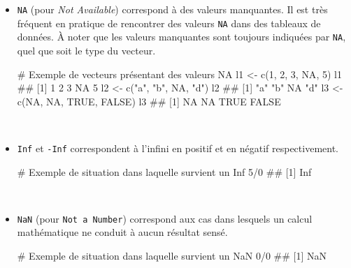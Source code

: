 \documentclass[12pt,twosided, notitlepage]{book}
\newenvironment{Shaded}{}{}
\newcommand{\KeywordTok}[1]{\textcolor[rgb]{0.00,0.00,1.00}{#1}}
\newcommand{\DecValTok}[1]{#1}
\newcommand{\StringTok}[1]{\textcolor[rgb]{0.00,0.50,0.50}{#1}}
\newcommand{\CommentTok}[1]{\textcolor[rgb]{0.00,0.50,0.00}{#1}}
\newcommand{\OtherTok}[1]{\textcolor[rgb]{1.00,0.25,0.00}{#1}}
\newcommand{\OperatorTok}[1]{#1}
\newcommand{\NormalTok}[1]{#1}
\renewenvironment{Shaded}{\begin{snugshade}}{\end{snugshade}}
\begin{document}
\begin{itemize}
\item
  \texttt{NA} (pour \emph{Not Available}) correspond à des valeurs
  manquantes. Il est très fréquent en pratique de rencontrer des valeurs
  \texttt{NA} dans des tableaux de données. À noter que les valeurs
  manquantes sont toujours indiquées par \texttt{NA}, quel que soit le
  type du vecteur.

\begin{Shaded}
\begin{Highlighting}[]
\CommentTok{# Exemple de vecteurs présentant des valeurs NA}
\NormalTok{l1 <-}\StringTok{ }\KeywordTok{c}\NormalTok{(}\DecValTok{1}\NormalTok{, }\DecValTok{2}\NormalTok{, }\DecValTok{3}\NormalTok{, }\OtherTok{NA}\NormalTok{, }\DecValTok{5}\NormalTok{)}
\NormalTok{l1}
\NormalTok{  ## [1]  1  2  3 NA  5}
\NormalTok{l2 <-}\StringTok{ }\KeywordTok{c}\NormalTok{(}\StringTok{"a"}\NormalTok{, }\StringTok{"b"}\NormalTok{, }\OtherTok{NA}\NormalTok{, }\StringTok{"d"}\NormalTok{)}
\NormalTok{l2}
\NormalTok{  ## [1] "a" "b" NA  "d"}
\NormalTok{l3 <-}\StringTok{ }\KeywordTok{c}\NormalTok{(}\OtherTok{NA}\NormalTok{, }\OtherTok{NA}\NormalTok{, }\OtherTok{TRUE}\NormalTok{, }\OtherTok{FALSE}\NormalTok{)}
\NormalTok{l3}
\NormalTok{  ## [1]    NA    NA  TRUE FALSE}
\end{Highlighting}
\end{Shaded}
\end{itemize}

~

\begin{itemize}
\item
  \texttt{Inf} et \texttt{-Inf} correspondent à l'infini en positif et
  en négatif respectivement.

\begin{Shaded}
\begin{Highlighting}[]
\CommentTok{# Exemple de situation dans laquelle survient un Inf}
\DecValTok{5}\OperatorTok{/}\DecValTok{0}
\NormalTok{  ## [1] Inf}
\end{Highlighting}
\end{Shaded}
\end{itemize}

~

\begin{itemize}
\item
  \texttt{NaN} (pour \texttt{Not\ a\ Number}) correspond aux cas dans
  lesquels un calcul mathématique ne conduit à aucun résultat sensé.

\begin{Shaded}
\begin{Highlighting}[]
\CommentTok{# Exemple de situation dans laquelle survient un NaN}
\DecValTok{0}\OperatorTok{/}\DecValTok{0}
\NormalTok{  ## [1] NaN}
\end{Highlighting}
\end{Shaded}
\end{itemize}
\end{document}
